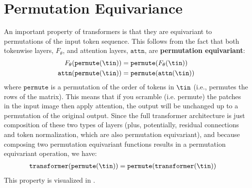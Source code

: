 \section{Permutation Equivariance}
An important property of transformers is that they are equivariant to permutations of the input token sequence. This follows from the fact that both tokenwise layers, $F_{\theta}$, and attention layers, $\texttt{attn}$, are \textbf{permutation equivariant}:
\begin{align}
    F_{\theta}(\texttt{permute}(\tin))    & = \texttt{permute}(F_{\theta}(\tin))    \\
    \texttt{attn}(\texttt{permute}(\tin)) & = \texttt{permute}(\texttt{attn}(\tin))
\end{align}
where $\texttt{permute}$ is a permutation of the order of tokens in $\tin$ (i.e., permutes the rows of the matrix). This means that if you scramble (i.e. permute) the patches in the input image then apply attention, the output will be unchanged up to a permutation of the original output. Since the full transformer architecture is just composition of these two types of layers (plus, potentially, residual connections and token normalization, which are also permutation equivariant), and because composing two permutation equivariant functions results in a permutation equivariant operation, we have:
\begin{align}
    \texttt{transformer}(\texttt{permute}(\tin)) & = \texttt{permute}(\texttt{transformer}(\tin))
\end{align}
This property is visualized in \fig{\ref{fig:transformers:permutation_equivariance}}.

